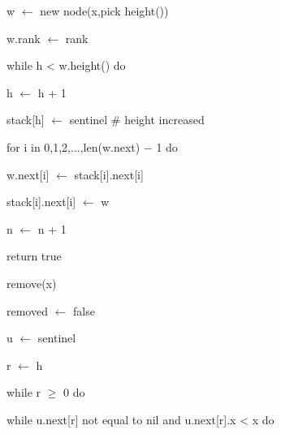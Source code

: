 \documentclass[12pt]{article}
\renewcommand{\_}{\kern-1.5pt\textunderscore\kern-1.5pt}
\begin{document}
w $ \leftarrow $  new node(x,pick height()) \par

w.rank $ \leftarrow $  rank\par

while h < w.height() do \par

\begin{adjustwidth}{0.5in}{0.0in}
h $ \leftarrow $  h + 1 \par

\end{adjustwidth}

\begin{adjustwidth}{0.5in}{0.0in}
stack[h] $ \leftarrow $  sentinel $\#$  height increased \par

\end{adjustwidth}

for i in 0,1,2,...,len(w.next) $-$  1 do \par

\begin{adjustwidth}{0.5in}{0.0in}
w.next[i] $ \leftarrow $  stack[i].next[i] \par

\end{adjustwidth}

\begin{adjustwidth}{0.5in}{0.0in}
stack[i].next[i] $ \leftarrow $  w \par

\end{adjustwidth}

n $ \leftarrow $  n + 1 \par

return true\par

remove(x) \par

removed $ \leftarrow $  false \par

u $ \leftarrow $  sentinel \par

r $ \leftarrow $  h\par

while r $ \geq $  0 do \par

\begin{adjustwidth}{0.5in}{0.0in}
while u.next[r] not equal to nil and u.next[r].x < x do \par

\end{adjustwidth}
\end{document}
